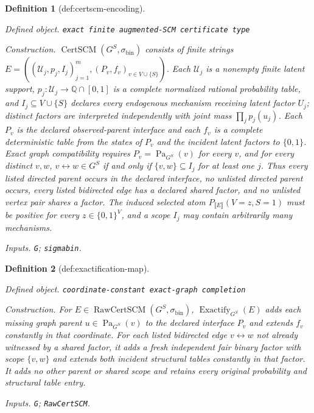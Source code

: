\documentclass{article}
\newtheorem{definition}{Definition}
\begin{document}
\begin{definition}[def:certscm-encoding]\label{def:certscm-encoding}
\par\smallskip\noindent\emph{Defined object.} \texttt{exact finite augmented-\allowbreak{}SCM certificate type}
\par\smallskip\noindent\emph{Construction.} \(\operatorname{CertSCM}(G^S,\sigma_{\mathrm{bin}})\) consists of finite strings \(E=((\mathcal U_j,p_j,I_j)_{j=1}^m,(P_v,f_v)_{v\in V\cup\{S\}})\). Each \(\mathcal U_j\) is a nonempty finite latent support, \(p_j:\mathcal U_j\to\mathbb Q\cap[0,1]\) is a complete normalized rational probability table, and \(I_j\subseteq V\cup\{S\}\) declares every endogenous mechanism receiving latent factor \(U_j\); distinct factors are interpreted independently with joint mass \(\prod_jp_j(u_j)\). Each \(P_v\) is the declared observed-parent interface and each \(f_v\) is a complete deterministic table from the states of \(P_v\) and the incident latent factors to \(\{0,1\}\). Exact graph compatibility requires \(P_v=\operatorname{Pa}_{G^S}(v)\) for every \(v\), and for every distinct \(v,w\), \(v\leftrightarrow w\in G^S\) if and only if \(\{v,w\}\subseteq I_j\) for at least one \(j\). Thus every listed directed parent occurs in the declared interface, no unlisted directed parent occurs, every listed bidirected edge has a declared shared factor, and no unlisted vertex pair shares a factor. The induced selected atom \(P_{\llbracket E\rrbracket}(V=z,S=1)\) must be positive for every \(z\in\{0,1\}^V\), and a scope \(I_j\) may contain arbitrarily many mechanisms.
\par\smallskip\noindent\emph{Inputs.} \texttt{G}; \texttt{sigmabin}.
\end{definition}

\begin{definition}[def:exactification-map]\label{def:exactification-map}
\par\smallskip\noindent\emph{Defined object.} \texttt{coordinate-\allowbreak{}constant exact-\allowbreak{}graph completion}
\par\smallskip\noindent\emph{Construction.} For \(E\in\operatorname{RawCertSCM}(G^S,\sigma_{\mathrm{bin}})\), \(\operatorname{Exactify}_{G^S}(E)\) adds each missing graph parent \(u\in\operatorname{Pa}_{G^S}(v)\) to the declared interface \(P_v\) and extends \(f_v\) constantly in that coordinate. For each listed bidirected edge \(v\leftrightarrow w\) not already witnessed by a shared factor, it adds a fresh independent fair binary factor with scope \(\{v,w\}\) and extends both incident structural tables constantly in that factor. It adds no other parent or shared scope and retains every original probability and structural table entry.
\par\smallskip\noindent\emph{Inputs.} \texttt{G}; \texttt{RawCertSCM}.
\end{definition}
\end{document}
